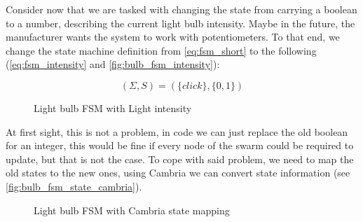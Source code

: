 \documentclass[a4paper]{article}
\begin{document}
Consider now that we are tasked with changing the state from carrying a boolean to a number,
describing the current light bulb intensity.
Maybe in the future, the manufacturer wants the system to work with potentiometers.
To that end, we change the state machine definition from \autoref{eq:fsm_short}
to the following (\autoref{eq:fsm_intensity} and \autoref{fig:bulb_fsm_intensity}):

\begin{equation}
    (\Sigma, S) = (\{click\}, \{0, 1\})
    \label{eq:fsm_intensity}
\end{equation}

\begin{figure}[ht]
    \centering
    \caption{Light bulb FSM with Light intensity}
    \label{fig:bulb_fsm_intensity}
\end{figure}

At first sight, this is not a problem, in code we can just replace the old boolean for an integer,
this would be fine if every node of the swarm could be required to update, but that is not the case.
To cope with said problem, we need to map the old states to the new ones,
using Cambria \cite{Cambria2020} we can convert state information (see \autoref{fig:bulb_fsm_state_cambria}).

\begin{figure}[ht]
    \centering
    \caption{Light bulb FSM with Cambria state mapping}
    \label{fig:bulb_fsm_state_cambria}
\end{figure}
\end{document}
